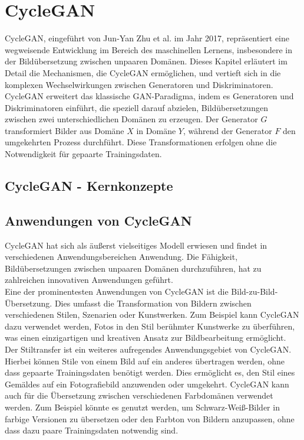 \section{CycleGAN}
CycleGAN, eingeführt von Jun-Yan Zhu et al. im Jahr 2017, repräsentiert eine wegweisende Entwicklung im Bereich des maschinellen Lernens, insbesondere in der Bildübersetzung zwischen unpaaren Domänen. Dieses Kapitel erläutert im Detail die Mechanismen, die CycleGAN ermöglichen, und vertieft sich in die komplexen Wechselwirkungen zwischen Generatoren und Diskriminatoren. 
CycleGAN erweitert das klassische GAN-Paradigma, indem es Generatoren und Diskriminatoren einführt, die speziell darauf abzielen, Bildübersetzungen zwischen zwei unterschiedlichen Domänen zu erzeugen. Der Generator $G$ transformiert Bilder aus Domäne $X$ in Domäne $Y$, während der Generator $F$ den umgekehrten Prozess durchführt. Diese Transformationen erfolgen ohne die Notwendigkeit für gepaarte Trainingsdaten.

\subsection{CycleGAN - Kernkonzepte}


\subsection{Anwendungen von CycleGAN}
CycleGAN hat sich als äußerst vielseitiges Modell erwiesen und findet in verschiedenen Anwendungsbereichen Anwendung. Die Fähigkeit, Bildübersetzungen zwischen unpaaren Domänen durchzuführen, hat zu zahlreichen innovativen Anwendungen geführt.
\\
Eine der prominentesten Anwendungen von CycleGAN ist die Bild-zu-Bild-Übersetzung. Dies umfasst die Transformation von Bildern zwischen verschiedenen Stilen, Szenarien oder Kunstwerken. Zum Beispiel kann CycleGAN dazu verwendet werden, Fotos in den Stil berühmter Kunstwerke zu überführen, was einen einzigartigen und kreativen Ansatz zur Bildbearbeitung ermöglicht.
Der Stiltransfer ist ein weiteres aufregendes Anwendungsgebiet von CycleGAN. Hierbei können Stile von einem Bild auf ein anderes übertragen werden, ohne dass gepaarte Trainingsdaten benötigt werden. Dies ermöglicht es, den Stil eines Gemäldes auf ein Fotografiebild anzuwenden oder umgekehrt. CycleGAN kann auch für die Übersetzung zwischen verschiedenen Farbdomänen verwendet werden. Zum Beispiel könnte es genutzt werden, um Schwarz-Weiß-Bilder in farbige Versionen zu übersetzen oder den Farbton von Bildern anzupassen, ohne dass dazu paare Trainingsdaten notwendig sind.
